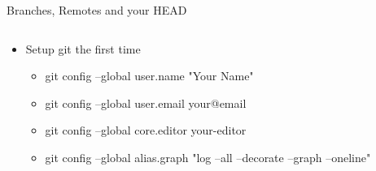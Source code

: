 \documentclass[xetex]{beamer}
\begin{document}
\begin{frame}{Branches, Remotes and your HEAD}
  \begin{columns}
    \begin{column}{1.05\linewidth}
      \begin{itemize}
        \item Setup git the first time
          \begin{itemize} \ttfamily \footnotesize
            \item git config --global user.name "Your Name"
            \item git config --global user.email your@email
            \item git config --global core.editor your-editor 
            \item git config --global alias.graph "log --all --decorate --graph --oneline"
          \end{itemize}
      \end{itemize}
    \end{column}
  \end{columns}


\end{frame}
\end{document}
